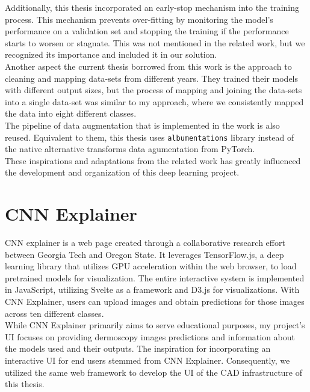 Additionally, this thesis incorporated an early-stop mechanism into the training process. This mechanism prevents over-fitting by monitoring the model's performance on a validation set and stopping the training if the performance starts to worsen or stagnate.
This was not mentioned in the related work, but we recognized its importance and included it in our solution. \\

Another aspect the current thesis borrowed from this work is the approach to cleaning and mapping data-sets from different years. They trained their models with different output sizes, but the process of mapping and joining the data-sets into a single data-set was similar to my approach,
where we consistently mapped the data into eight different classes. \\

The pipeline of data augmentation that is implemented in the work is also reused. Equivalent to them,
this thesis uses {\tt albumentations}\cite{Albumentations} library instead of the native alternative transforms data agumentation from PyTorch. \\

These inspirations and adaptations from the related work has greatly influenced the development and organization of this deep learning project.

\section{CNN Explainer}

CNN explainer is a web page created through a collaborative research effort between Georgia Tech and Oregon State\cite{CNNExplainer}. It leverages TensorFlow.js, a deep learning library that utilizes GPU acceleration within the web browser, to load pretrained models for visualization. The entire interactive system is implemented in JavaScript, utilizing Svelte as a framework and D3.js for visualizations. With CNN Explainer, users can upload images and obtain predictions for those images across ten different classes. \\

While CNN Explainer primarily aims to serve educational purposes, my project's UI focuses on providing dermoscopy images predictions and information about the models used and their outputs. The inspiration for incorporating an interactive UI for end users stemmed from CNN Explainer.
Consequently, we utilized the same web framework to develop the UI of the CAD infrastructure of this thesis.

